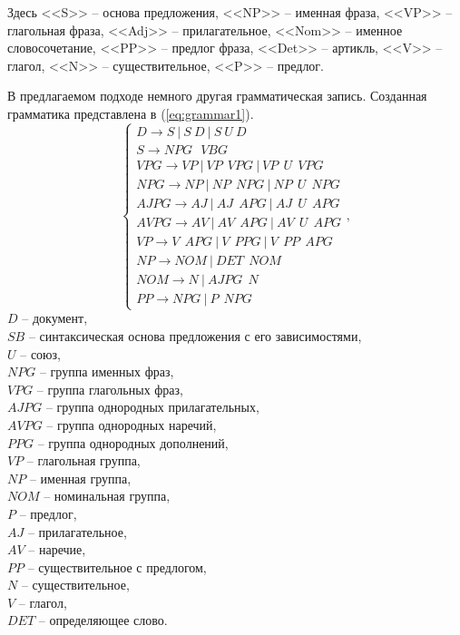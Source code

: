 \documentclass[../main]{subfiles}
\begin{document}
Здесь <<S>> -- основа предложения, <<NP>> -- именная фраза, <<VP>> -- глагольная фраза, <<Adj>> -- прилагательное, <<Nom>> -- именное словосочетание, <<PP>> -- предлог фраза, <<Det>> -- артикль, <<V>> -- глагол, <<N>> -- существительное, <<P>> -- предлог.

В предлагаемом подходе немного другая грамматическая запись. Созданная грамматика представлена в (\ref{eq:grammar1}). 
\begin{equation}
    \label{eq:grammar1}
    \left\{ 
        \begin{array}{l}
            D \rightarrow S\ |\ S\ D\ |\ S\ U\ D\ \\
            S \rightarrow NPG\ \ \ VBG \\
            VPG \rightarrow VP\ |\ VP\ \ VPG\ |\ VP\ \ U\ \ VPG \\
            NPG \rightarrow NP\ |\ NP\ \ NPG\ |\ NP\ \ U\ \ NPG \\
            AJPG \rightarrow AJ\ |\ AJ\ \ APG\ |\ AJ\ \ U\ \ APG \\
            AVPG \rightarrow AV\ |\ AV\ \ APG\ |\ AV\ \ U\ \ APG \\
            VP \rightarrow V \ \ APG\ |\ V\ \ PPG\ |\ V\ \ PP\ \ APG \\
            NP \rightarrow NOM\ |\ DET\ \ NOM \\
            NOM \rightarrow N\ |\ AJPG\ \ N \\
            PP \rightarrow NPG\ |\ P\ \ NPG
        \end{array}
    \right.,
\end{equation}
$D$ -- документ,\\
\makebox[1.25cm]{}$SB$ -- синтаксическая основа предложения с его зависимостями,\\
\makebox[1.25cm]{}$U$ -- союз,\\
\makebox[1.25cm]{}$NPG$ -- группа именных фраз,\\
\makebox[1.25cm]{}$VPG$ -- группа глагольных фраз,\\
\makebox[1.25cm]{}$AJPG$ -- группа однородных прилагательных,\\
\makebox[1.25cm]{}$AVPG$ -- группа однородных наречий,\\
\makebox[1.25cm]{}$PPG$ -- группа однородных дополнений,\\
\makebox[1.25cm]{}$VP$ -- глагольная группа,\\
\makebox[1.25cm]{}$NP$ -- именная группа,\\
\makebox[1.25cm]{}$NOM$ -- номинальная группа,\\
\makebox[1.25cm]{}$P$ -- предлог,\\
\makebox[1.25cm]{}$AJ$ -- прилагательное,\\
\makebox[1.25cm]{}$AV$ -- наречие,\\
\makebox[1.25cm]{}$PP$ -- существительное с предлогом,\\
\makebox[1.25cm]{}$N$ -- существительное,\\
\makebox[1.25cm]{}$V$ -- глагол,\\
\makebox[1.25cm]{}$DET$ -- определяющее слово.
\end{document}
